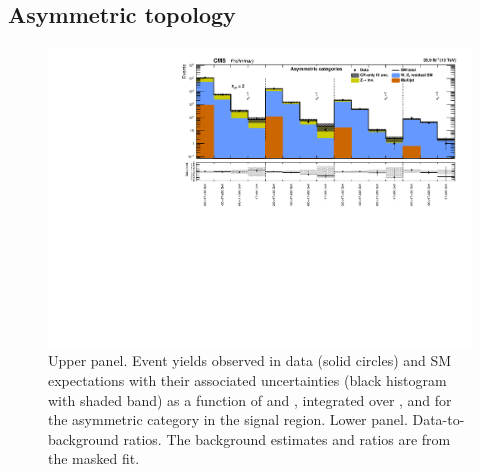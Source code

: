 \clearpage
\subsection{Asymmetric topology}

\begin{figure}[h!]
  \centering
  \caption{Upper panel. Event yields observed in data (solid circles)
    and SM expectations with their associated uncertainties (black
    histogram with shaded band) as a function of \nb and \scalht,
    integrated over \mht, and for the asymmetric \njet category
    in the signal region. Lower panel. Data-to-background ratios. The
    background estimates and ratios are from the masked fit. }
  \label{fig:mr_asym_pre}
  \includegraphics[width=1.\linewidth]{figures/results/36invfb_freeze/asym/summaryPlot_Asymmetric_prefit}
\end{figure}

